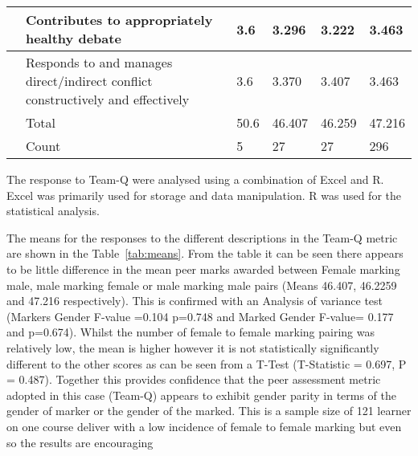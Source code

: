 \documentclass[sigconf, anonymous=true]{acmart}
\begin{document}
\begin{table*}[ht]
\begin{tabular} {| p{3cm} | p{8cm} | p{1cm}| p{1cm} | p{1cm}| p{1cm} |}
\hline
                                    & Contributes to appropriately healthy debate                                                      & 3.6                                                     & 3.296                                                 & 3.222                                                 & 3.463                                               \\
                                    
\hline
                                    & Responds to and manages direct/indirect conflict constructively and effectively                  & 3.6                                                     & 3.370                                                 & 3.407                                                 & 3.463                                               \\
\hline
& Total                                                                                                              & 50.6                                                    & 46.407                                                & 46.259                                                & 47.216                                              \\
\hline
& Count                                                                                                              & 5                                                       & 27                                                    & 27                                                    & 296
\\
\hline
\end{tabular}
\label{tab:means}
\end{table*}
The response to Team-Q were analysed using a combination of Excel and R. Excel was primarily used for storage and data manipulation. R was used for the statistical analysis. 

The means for the responses to the different descriptions in the Team-Q metric are shown in the Table~\ref{tab:means}. From the table it can be seen there appears to be little difference in the mean peer marks awarded between Female marking male, male marking female or male marking male pairs (Means 46.407, 46.2259 and 47.216 respectively). This is confirmed with an Analysis of variance test (Markers Gender F-value =0.104 p=0.748 and Marked Gender F-value= 0.177 and p=0.674). Whilst the number of female to female marking pairing was relatively low, the mean is higher however it is not statistically significantly different to the other scores as can be seen from a T-Test (T-Statistic = 0.697, P = 0.487). Together this provides confidence that the peer assessment metric adopted in this case (Team-Q) appears to exhibit gender parity in terms of the gender of marker or the gender of the marked. This is a sample size of 121 learner on one course deliver with a low incidence of female to female marking but even so the results are encouraging
\end{document}
